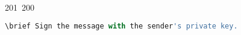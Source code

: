 201~200~\documentclass{article}
\begin{document}
\begin{lstlisting}[language=Python, caption=Signing and Verifying Messages]
	                                                                                                                                                                                                                                                                                                	                                                                                                                                        	    	                                                                                                	                                                                                                                                                                                                                                                                                                                                	                                                                        	                                                                        	                                                                                                                                        	                                                                                                                                                                                                                        	                                                                                                        \brief Sign the message with the sender's private key.
	                                                                                                                                                                                                                                                                                                	                                                                                                                                        	    	                                                                                                	                                                                                                                                                                                                                                                                                                                                	                                                                        	                                                                        	                                                                                                                                        	                                                                                                                                                                                                                        	                                                                                                            \param private_key The private key used to sign the message.

\end{lstlisting}
\end{document}
